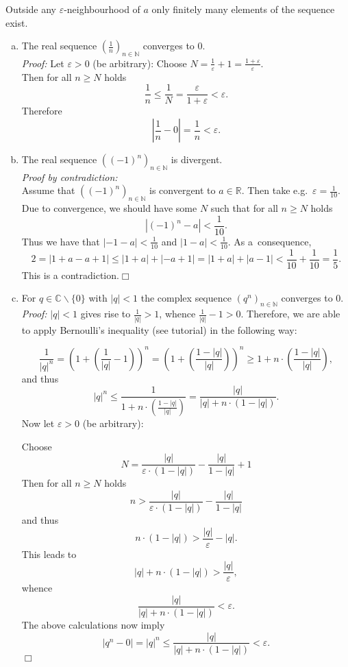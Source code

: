 Outside any $\varepsilon$-neighbourhood of $a$ only finitely many elements of the sequence exist.

\begin{example}\label{ex:basicconvseq}
 \begin{enumerate}[(a)]
  \item The real sequence $(\frac1n)_{n\in\mathbb{N}}$ converges to 0.\\
{\em Proof:} Let $\varepsilon>0$ (be arbitrary): Choose $N=\frac1\varepsilon+1=\frac{1+\varepsilon}\varepsilon$.\\
Then for all $n\geq N$ holds
\[\frac1n\leq\frac1N=\frac{\varepsilon}{1+\varepsilon}<\varepsilon.\]
Therefore
\[\left|\frac1n-0\right|=\frac1n<\varepsilon.\]
	\whiteskipsmall
\item  The real sequence $((-1)^n)_{n\in\mathbb{N}}$ is divergent.\\
{\em Proof by contradiction:}\\
Assume that $((-1)^n)_{n\in\mathbb{N}}$ is convergent to $a\in\mathbb{R}$. Then take e.g.\ $\varepsilon=\frac1{10}$. Due to convergence, we should have some $N$ such that for all $n\geq N$ holds
\[|(-1)^n-a|<{\textstyle\frac1{10}}.\]
Thus we have that $|-1-a|<\frac1{10}$ and $|1-a|<\frac1{10}$. As a~consequence,
\[2=|1+a-a+1|\leq|1+a|+|-a+1|=|1+a|+|a-1|<{\textstyle\frac1{10}+\frac1{10}=\frac1{5}}.\]
This is a contradiction.\hfill$\Box$
\item For $q\in\mathbb{C}\backslash\{0\}$ with $|q|<1$ the complex sequence $(q^n)_{n\in\mathbb{N}}$ converges to 0.\\
{\em Proof:}
$|q|<1$ gives rise to $\frac1{|q|}>1$, whence $\frac1{|q|}-1>0$. Therefore, we are able to apply Bernoulli's inequality (see tutorial) in the following way:

\[\frac1{|q|^n}=\left(1+\left(\frac1{|q|}-1\right)\right)^n
=\left(1+\left(\frac{1-|q|}{|q|}\right)\right)^n\geq 1+n\cdot \left(\frac{1-|q|}{|q|}\right),
\]
and thus
\[|q|^n\leq \frac1{1+n\cdot \left(\frac{1-|q|}{|q|}\right)}=\frac{|q|}{|q|+n\cdot ({1-|q|})}.\]
Now let $\varepsilon>0$ (be arbitrary):

Choose
\[N=\frac{|q|}{\varepsilon\cdot(1-|q|)}-\frac{|q|}{1-|q|}+1\]
Then for all $n\geq N$ holds
\[n>\frac{|q|}{\varepsilon\cdot(1-|q|)}-\frac{|q|}{1-|q|}\]
and thus
\[n\cdot ({1-|q|})>\frac{|q|}{\varepsilon}-|q|.\]
This leads to
\[|q|+n\cdot ({1-|q|})>\frac{|q|}{\varepsilon},\]
whence
\[\frac{|q|}{|q|+n\cdot ({1-|q|})}<\varepsilon.\]
The above calculations now imply
\[|q^n-0|=|q|^n\leq\frac{|q|}{|q|+n\cdot ({1-|q|})}<\varepsilon.\]
\hfill$\Box$
 \end{enumerate}
\end{example}

